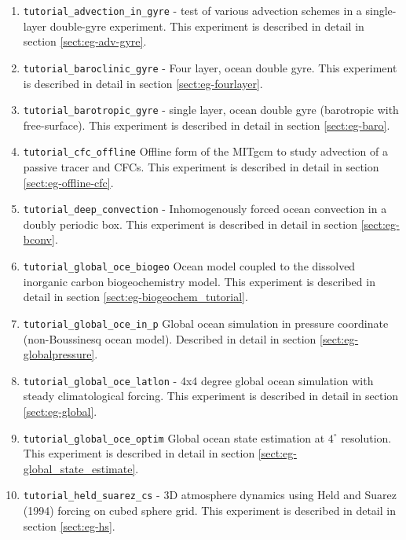 \begin{enumerate}
  
\item \texttt{tutorial\_advection\_in\_gyre} - test of various
  advection schemes in a single-layer double-gyre experiment.
  This experiment is described in detail in section
  \ref{sect:eg-adv-gyre}.

\item \texttt{tutorial\_baroclinic\_gyre} - Four layer, ocean double
  gyre. This experiment is described in detail in section
  \ref{sect:eg-fourlayer}.

\item \texttt{tutorial\_barotropic\_gyre} - single layer, ocean double
  gyre (barotropic with free-surface). 
  This experiment is described in detail in section \ref{sect:eg-baro}.

\item \texttt{tutorial\_cfc\_offline} Offline form of the MITgcm to
  study advection of a passive tracer and CFCs.
  This experiment is described in detail in section \ref{sect:eg-offline-cfc}.

\item \texttt{tutorial\_deep\_convection} - Inhomogenously forced
  ocean convection in a doubly periodic box. This experiment is
  described in detail in section \ref{sect:eg-bconv}.

\item \texttt{tutorial\_global\_oce\_biogeo} Ocean model coupled to
  the dissolved inorganic carbon biogeochemistry model. This
  experiment is described in detail in section
  \ref{sect:eg-biogeochem_tutorial}.

\item \texttt{tutorial\_global\_oce\_in\_p} Global ocean simulation in
  pressure coordinate (non-Boussinesq ocean model). Described in
  detail in section \ref{sect:eg-globalpressure}.

\item \texttt{tutorial\_global\_oce\_latlon} - 4x4 degree global ocean
  simulation with steady climatological forcing. This experiment is
  described in detail in section \ref{sect:eg-global}.

\item \texttt{tutorial\_global\_oce\_optim} Global ocean state
  estimation at $4^\circ$ resolution.  This experiment is described in
  detail in section \ref{sect:eg-global_state_estimate}.

\item \texttt{tutorial\_held\_suarez\_cs} - 3D atmosphere dynamics
  using Held and Suarez (1994) forcing on cubed sphere grid.  This
  experiment is described in detail in section \ref{sect:eg-hs}.
  

\end{enumerate}
